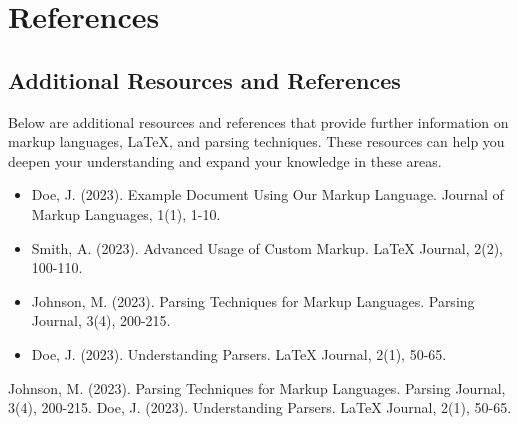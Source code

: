 \documentclass[oneside]{book}
\begin{document}
\newpage
\chapter{References}
\section{Additional Resources and References}
Below are additional resources and references that provide further information on markup languages, LaTeX, and parsing techniques. These resources can help you deepen your understanding and expand your knowledge in these areas.\par
\begin{itemize}
\item Doe, J. (2023). Example Document Using Our Markup Language. Journal of Markup Languages, 1(1), 1-10.
\item Smith, A. (2023). Advanced Usage of Custom Markup. LaTeX Journal, 2(2), 100-110.
\item Johnson, M. (2023). Parsing Techniques for Markup Languages. Parsing Journal, 3(4), 200-215.
\item Doe, J. (2023). Understanding Parsers. LaTeX Journal, 2(1), 50-65.
\end{itemize}
\begin{thebibliography}{100}
Johnson, M. (2023). Parsing Techniques for Markup Languages. Parsing Journal, 3(4), 200-215.
Doe, J. (2023). Understanding Parsers. LaTeX Journal, 2(1), 50-65.
\end{thebibliography}
\end{document}
